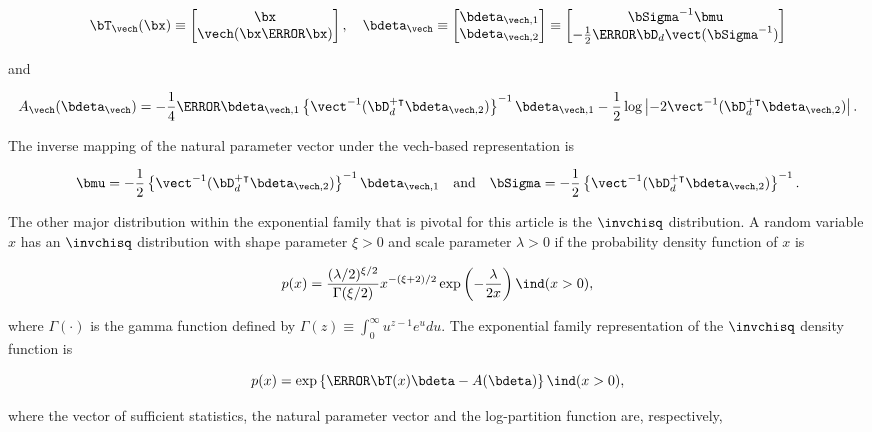 \documentclass[12pt]{article}
\theoremstyle{plain}
\theoremstyle{definition}
\theoremstyle{remark}
\begin{document}
\[
	\bT_{\vech} (\bx) \equiv \begin{bmatrix}
		\bx \\
		\vech (\bx \T{\bx})
	\end{bmatrix}, \quad
	\bdeta_{\vech} \equiv \begin{bmatrix}
		\bdeta_{\vech, 1} \\
		\bdeta_{\vech, 2}
	\end{bmatrix} \equiv \begin{bmatrix}
		\bSigma^{-1} \bmu \\
		-\frac12 \T{\bD_d} \vect(\bSigma^{-1})
	\end{bmatrix}
\]

\noindent and

\[
	A_{\vech} (\bdeta_{\vech}) =
		-\frac14 \T{\bdeta}_{\vech, 1} \left\{
			\vect^{-1} (\bD_d^{+ \intercal} \bdeta_{\vech, 2})
		\right\}^{-1} \bdeta_{\vech, 1}
		- \frac12 \log \left| -2 \vect^{-1} (\bD_d^{+ \intercal} \bdeta_{\vech, 2}) \right|.
\]

\noindent The inverse mapping of the natural parameter vector under the vech-based representation is

\begin{equation}
	\bmu = -\frac12 \left\{ \vect^{-1} (\bD_d^{+ \intercal}\bdeta_{\vech, 2}) \right\}^{-1} \bdeta_{\vech, 1} \quad
	\text{and} \quad
	\bSigma = -\frac12 \left\{ \vect^{-1} (\bD_d^{+ \intercal}\bdeta_{\vech, 2}) \right\}^{-1}.
\label{gauss_vech_comm_params}
\end{equation}

The other major distribution within the exponential family that is pivotal for this article is the $\invchisq$ distribution.
A random variable $x$ has an $\invchisq$ distribution with shape parameter $\xi > 0$ and scale parameter
$\lambda > 0$ if the probability density function of $x$ is

\[
	p(x) = 
		\frac{(\lambda/2)^{\xi/2}}{\Gamma (\xi/2)}
		x^{-(\xi + 2)/2} \exp \left( -\frac{\lambda}{2 x} \right) \ind (x > 0),
\]

\noindent where $\Gamma (\cdot)$ is the gamma function defined by $\Gamma (z) \equiv \int_0^\infty u^{z - 1} e^u
du$. The exponential family representation of the $\invchisq$ density function is

\[
	p(x) = \exp \left\{ \T{\bT (x)} \bdeta - A(\bdeta) \right\} \ind (x > 0),
\]

\noindent where the vector of sufficient statistics, the natural parameter vector and the log-partition function are,
respectively,
\end{document}
